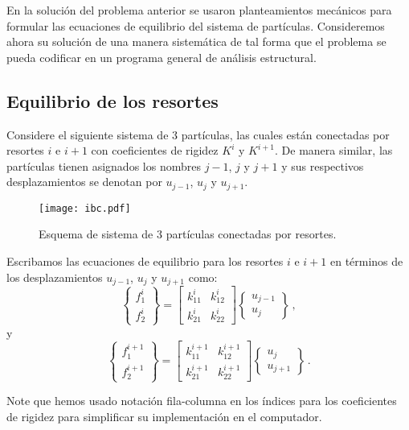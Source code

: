 En la solución del problema anterior se usaron planteamientos mecánicos para 
formular las ecuaciones de equilibrio del sistema de partículas. Consideremos 
ahora su solución de una manera sistemática de tal forma que el problema se 
pueda codificar en un programa general de análisis estructural.

\subsection{Equilibrio de los resortes}

Considere el siguiente sistema de 3 partículas, las cuales están conectadas por 
resortes $i$ e $i+1$ con coeficientes de rigidez $K^i$ y $K^{i+1}$. De manera 
similar, las partículas tienen asignados los nombres $j-1$, $j$ y $j+1$ y sus 
respectivos desplazamientos se denotan por $u_{j-1}$, $u_{j}$ y $u_{j+1}$.
\begin{figure}[H]
\centering
\texttt{[image: ibc.pdf]}
\caption{Esquema de sistema de 3 partículas conectadas por resortes.}
\label{fig:ibc}
\end{figure}


Escribamos las ecuaciones de equilibrio para los resortes $i$ e $i+1$ en 
términos de los desplazamientos $u_{j - 1}$, $u_j$ y $u_{j + 1}$ como:
$$\begin{Bmatrix} f_1^i\\ f_2^i \end{Bmatrix}
= \begin{bmatrix}
k_{11}^i & k_{12}^i\\
k_{21}^i & k_{22}^i
\end{bmatrix}
\begin{Bmatrix} u_{j - 1}\\ u_j \end{Bmatrix}\, ,$$
y
$$\begin{Bmatrix} f_1^{i + 1}\\ f_2^{i + 1}\end{Bmatrix}
= \begin{bmatrix}
k_{11}^{i + 1} & k_{12}^{i + 1}\\
k_{21}^{i + 1} & k_{22}^{i + 1} \end{bmatrix}
\begin{Bmatrix} u_j\\ u_{j + 1} \end{Bmatrix}\, .$$

Note que hemos usado notación fila-columna en los índices para los coeficientes 
de rigidez para simplificar su implementación en el computador.


